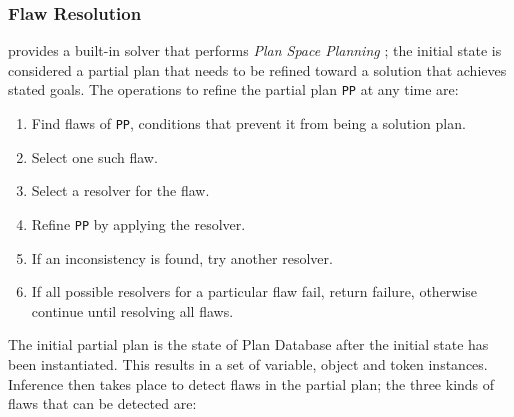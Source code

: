 \subsubsection{Flaw Resolution}
\label{sec:europa:flaws}

\eu provides a built-in solver that performs \emph{Plan Space
  Planning} \cite{ghallab04}; the initial state is considered a
partial plan that needs to be refined toward a solution that achieves
stated goals. The operations to refine the partial plan \texttt{PP} at
any time are:

\begin{enumerate}

\item Find flaws of \texttt{PP}, \ie conditions that prevent it from
  being a solution plan.

\item Select one such flaw.

\item Select a resolver for the flaw.

\item Refine \texttt{PP} by applying the resolver.

\item If an inconsistency is found, try another resolver.

\item If all possible resolvers for a particular flaw fail, return
  failure, otherwise continue until resolving all flaws.

\end{enumerate}
	

The initial partial plan is the state of \eus Plan Database after the
initial state has been instantiated. This results in a set of
variable, object and token instances. Inference then takes place to
detect flaws in the partial plan; the three kinds of flaws that can be
detected are:

